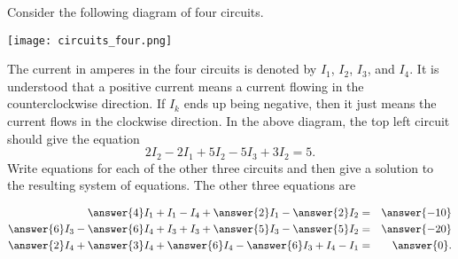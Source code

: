 \documentclass{ximera}
\author{Zack Reed}
\begin{document}
\begin{exercise}

    Consider the following diagram of four circuits.
    \begin{center}
      \texttt{[image: circuits\_four.png]}
    \end{center}
    The current in amperes in the four circuits is denoted by $I_1$,
    $I_2$, $I_3$, and $I_4$. It is understood that a positive
    current means a current flowing in the counterclockwise direction. If
    $I_k$ ends up being negative, then it just means the current flows
    in the clockwise direction.  In the above diagram, the top left
    circuit should give the equation
    \begin{equation*}
      2I_2 - 2I_1+5I_2 - 5I_3+3I_2=5.
    \end{equation*}
    Write equations for each of the other three circuits and then give a solution
    to the resulting system of equations.
      The other three equations are
  
      \begin{eqnarray*}
        \answer{4}I_1 + I_1 - I_4 + \answer{2}I_1 - \answer{2}I_2 &=& \answer{-10} \\
        \answer{6}I_3 - \answer{6}I_4 + I_3 + I_3 + \answer{5}I_3 - \answer{5}I_2 &=& \answer{-20} \\
        \answer{2}I_4 + \answer{3}I_4 + \answer{6}I_4 - \answer{6}I_3 + I_4 - I_1 &=& \answer{0}.
      \end{eqnarray*}


\end{exercise}
\end{document}
